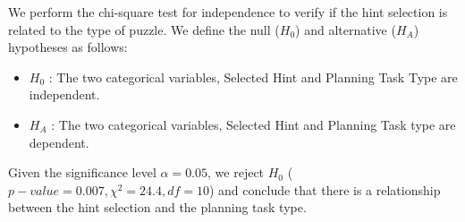 We perform the chi-square test for independence to verify if the hint selection is related to the type of puzzle.
We define the null ($H_0$) and alternative ($H_A$) hypotheses as follows:
\begin{itemize}
\item $H_0$ : The two categorical variables, Selected Hint and Planning Task Type are independent.
\item $H_A$ : The two categorical variables, Selected Hint and Planning Task type are dependent. 
\end{itemize} 
Given the significance level $\alpha=0.05$, we reject $H_0$ ($p-value= 0.007, \chi^2=24.4, df=10$) and conclude that there is a relationship between the hint selection and the planning task type.


\begin{table}[tpb]
\caption{The total number of hints requested from each type sorted by the request number - part 1}
\label{tab:reqnumberbreakdown1}
\end{table}


